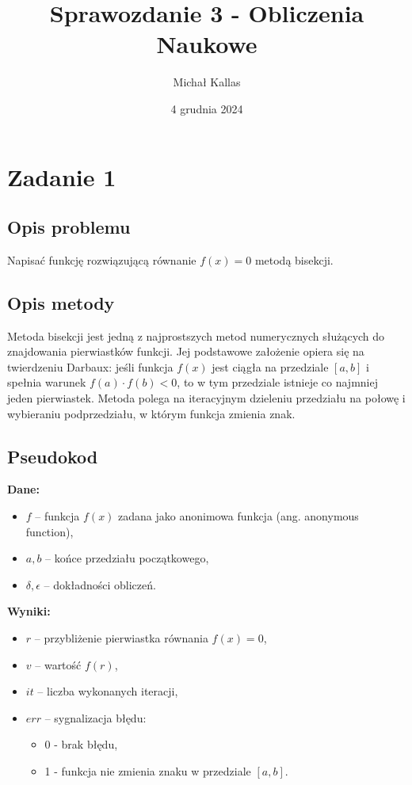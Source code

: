 \documentclass{article}
\title{Sprawozdanie 3 - Obliczenia Naukowe}
\author{Michał Kallas}
\date{4 grudnia 2024}
\begin{document}
\maketitle

\section{Zadanie 1}
\subsection{Opis problemu}
Napisać funkcję rozwiązującą równanie \( f(x) = 0 \) metodą bisekcji.

\subsection{Opis metody}
Metoda bisekcji jest jedną z najprostszych metod numerycznych służących do znajdowania pierwiastków funkcji. Jej podstawowe założenie opiera się na twierdzeniu Darbaux: jeśli funkcja $f(x)$ jest ciągła na przedziale $[a, b]$ i spełnia warunek $f(a) \cdot f(b) < 0$, to w tym przedziale istnieje co najmniej jeden pierwiastek. Metoda polega na iteracyjnym dzieleniu przedziału na połowę i wybieraniu podprzedziału, w którym funkcja zmienia znak. 

\subsection{Pseudokod}
\textbf{Dane:}
\begin{itemize}
  \item \( f \) – funkcja \( f(x) \) zadana jako anonimowa funkcja (ang. anonymous function),
  \item \( a, b \) – końce przedziału początkowego,
  \item \( \delta, \epsilon \) – dokładności obliczeń.
\end{itemize}

\noindent \textbf{Wyniki:}
\begin{itemize}
  \item \( r \) – przybliżenie pierwiastka równania \( f(x) = 0 \),
  \item \( v \) – wartość \( f(r) \),
  \item \( it \) – liczba wykonanych iteracji,
  \item \( err \) – sygnalizacja błędu:
  \begin{itemize}
    \item 0 - brak błędu,
    \item 1 - funkcja nie zmienia znaku w przedziale \([a, b]\).
  \end{itemize}
\end{itemize}
\end{document}
